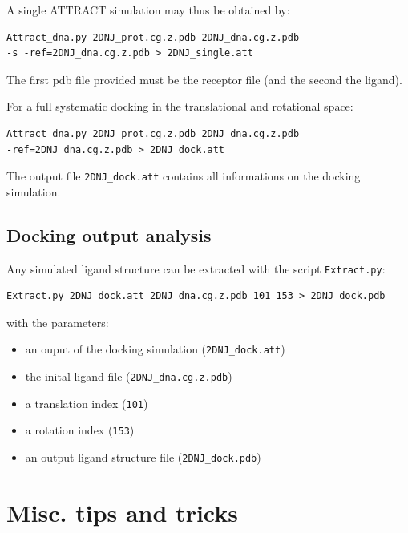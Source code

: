 \documentclass[12pt,a4paper]{article}
\begin{document}
A single ATTRACT simulation may thus be obtained by:
\begin{verbatim}
Attract_dna.py 2DNJ_prot.cg.z.pdb 2DNJ_dna.cg.z.pdb 
-s -ref=2DNJ_dna.cg.z.pdb > 2DNJ_single.att
\end{verbatim}

The first pdb file provided must be the receptor file (and the second the ligand).

For a full systematic docking in the translational and rotational space:
\begin{verbatim}
Attract_dna.py 2DNJ_prot.cg.z.pdb 2DNJ_dna.cg.z.pdb 
-ref=2DNJ_dna.cg.z.pdb > 2DNJ_dock.att
\end{verbatim}

The output file {\tt 2DNJ\_dock.att} contains all informations on the docking simulation.

\subsection{Docking output analysis}

Any simulated ligand structure can be extracted with the script {\tt Extract.py}:

\begin{verbatim}
Extract.py 2DNJ_dock.att 2DNJ_dna.cg.z.pdb 101 153 > 2DNJ_dock.pdb
\end{verbatim}

with the parameters:
\begin{itemize}
\item an ouput of the docking simulation ({\tt 2DNJ\_dock.att})
\item the inital ligand file ({\tt 2DNJ\_dna.cg.z.pdb})
\item a translation index ({\tt 101})
\item a rotation index ({\tt 153})
\item an output ligand structure file ({\tt 2DNJ\_dock.pdb})
\end{itemize}

\section{Misc. tips and tricks}
 
\end{document}
